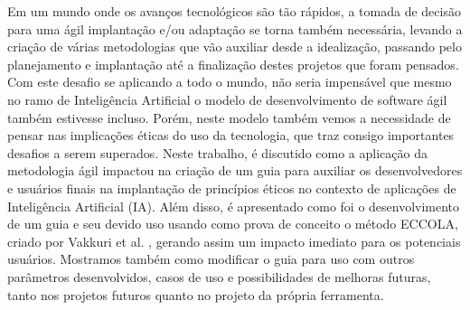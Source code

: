 Em um mundo onde os avanços tecnológicos são tão rápidos, a tomada de decisão para uma ágil implantação e/ou adaptação se torna também necessária, levando a criação de várias metodologias que vão auxiliar desde a idealização, passando pelo planejamento e implantação até a finalização destes projetos que foram pensados. Com este desafio se aplicando a todo o mundo, não seria impensável que mesmo no ramo de Inteligência Artificial o modelo de desenvolvimento de software ágil também estivesse incluso. Porém, neste modelo também vemos a necessidade de pensar nas implicações éticas do uso da tecnologia, que traz consigo importantes desafios a serem superados. Neste trabalho, é discutido como a aplicação da metodologia ágil impactou na criação de um guia para auxiliar os desenvolvedores e usuários finais na implantação de princípios éticos no contexto de aplicações de Inteligência Artificial (IA). Além disso, é apresentado como foi o desenvolvimento de um guia e seu devido uso usando como prova de conceito o método ECCOLA, criado por Vakkuri et al. \cite{ECCOLA}, gerando assim um impacto imediato para os potenciais usuários. Mostramos também como modificar o guia para uso com outros parâmetros desenvolvidos, casos de uso e possibilidades de melhoras futuras, tanto nos projetos futuros quanto no projeto da própria ferramenta.